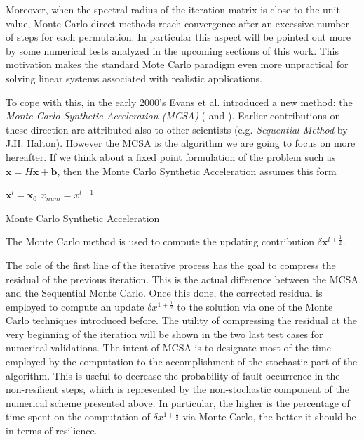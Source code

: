 \documentclass[a4paper,10pt]{article}
\begin{document}
Moreover, when the spectral radius of the iteration matrix is close to the 
unit 
value, Monte Carlo direct methods reach convergence after an excessive number 
of steps for each 
permutation. In particular this aspect will be pointed out more by some 
numerical tests analyzed in the upcoming sections of this work.
This motivation makes the standard Mote Carlo paradigm even more 
unpractical for solving linear systems associated with realistic applications. 
\newline

To cope with this, in the early 2000's Evans et al. introduced a new method: 
the 
\textit{Monte Carlo Synthetic Acceleration (MCSA)} 
(\cite{ESW2013} and \cite{EMSH2014}). Earlier contributions on these direction 
are attributed also to other scientists (e.g. \textit{Sequential Method} by 
J.H. Halton). However the MCSA is the algorithm we are going to focus on more 
hereafter. If 
we think about a fixed point formulation of the problem
such as $\mathbf{x}=H\mathbf{x}+\mathbf{b}$, then the Monte Carlo Synthetic 
Acceleration assumes this form

\begin{algorithm}[H]
 $\mathbf{x}^{l}=\mathbf{x}_0$\;
 $x_{num}=x^{l+1}$\; 
 \caption{Monte Carlo Synthetic Acceleration}
\end{algorithm}
The Monte Carlo method is used to compute the updating contribution $\delta 
\mathbf{x}^{l+\frac{1}{2}}$.

The role of the first line of the iterative process has the goal to compress 
the residual of the previous iteration. This is the actual difference 
between the MCSA and the Sequential Monte Carlo. Once this done, the corrected 
residual 
is employed to compute an update $\delta x^{1+\frac{1}{2}}$ to the solution via 
one of the Monte Carlo techniques introduced before. The utility of compressing 
the residual at the very beginning of the iteration will be shown in the two 
last test cases for numerical validations.
The intent of MCSA is to designate most of the time employed by the 
computation to the accomplishment of the stochastic part of the algorithm. 
This 
is useful to decrease the probability of fault occurrence in the non-resilient 
steps, which is represented by the non-stochastic component of the numerical 
scheme presented above. In particular, the higher is the percentage of time 
spent on the computation of $\delta x^{1+\frac{1}{2}}$ via Monte Carlo, the 
better it should be in terms of resilience.
\end{document}
